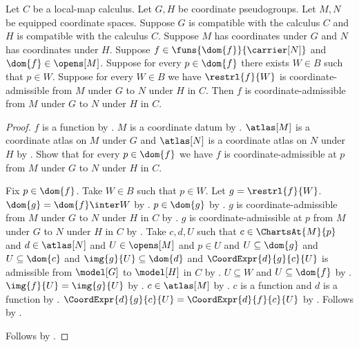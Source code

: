 \begin{theorem}\label{coordinate_admissible_locality}
    Let $C$ be a local-map calculus.
    Let $G,H$ be coordinate pseudogroups.
    Let $M,N$ be equipped coordinate spaces.
    Suppose $G$ is compatible with the calculus $C$ and $H$ is compatible with the calculus $C$.
    Suppose $M$ has coordinates under $G$ and $N$ has coordinates under $H$.
    Suppose $f\in\funs{\dom{f}}{\carrier[N]}$ and $\dom{f}\in\opens[M]$.
    Suppose for every $p\in\dom{f}$ there exists $W\in B$ such that $p\in W$.
    Suppose for every $W\in B$ we have
        $\restrl{f}{W}$ is coordinate-admissible from $M$ under $G$ to $N$ under $H$ in $C$.
    Then $f$ is coordinate-admissible from $M$ under $G$ to $N$ under $H$ in $C$.
\end{theorem}
\begin{proof}
    $f$ is a function by .
    $M$ is a coordinate datum by .
    $\atlas[M]$ is a coordinate atlas on $M$ under $G$ and
        $\atlas[N]$ is a coordinate atlas on $N$ under $H$ by .
    Show that for every $p\in\dom{f}$ we have
        $f$ is coordinate-admissible at $p$ from $M$ under $G$ to $N$ under $H$ in $C$.
    \begin{subproof}
        Fix $p\in\dom{f}$.
        Take $W\in B$ such that $p\in W$.
        Let $g=\restrl{f}{W}$.
        $\dom{g}=\dom{f}\inter W$ by .
        $p\in\dom{g}$ by .
        $g$ is coordinate-admissible from $M$ under $G$ to $N$ under $H$ in $C$ by \auto.
        $g$ is coordinate-admissible at $p$ from $M$ under $G$ to $N$ under $H$ in $C$ by
            .
        Take $c,d,U$ such that $c\in\ChartsAt{M}{p}$ and $d\in\atlas[N]$ and
            $U\in\opens[M]$ and $p\in U$ and $U\subseteq\dom{g}$ and $U\subseteq\dom{c}$ and
            $\img{g}{U}\subseteq\dom{d}$ and
            $\CoordExpr{d}{g}{c}{U}$ is admissible from $\model[G]$ to $\model[H]$ in $C$
            by .
        $U\subseteq W$ and $U\subseteq\dom{f}$ by .
        $\img{f}{U}=\img{g}{U}$ by .
        $c\in\atlas[M]$ by .
        $c$ is a function and $d$ is a function by
            .
        $\CoordExpr{d}{g}{c}{U}=\CoordExpr{d}{f}{c}{U}$ by
            .
        Follows by .
    \end{subproof}
    Follows by .
\end{proof}

